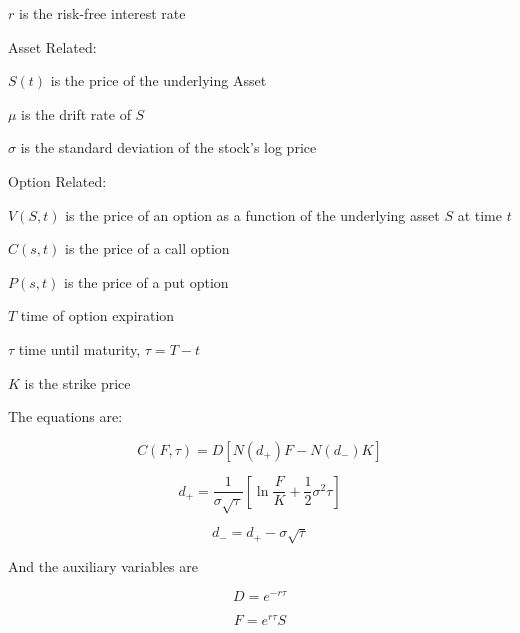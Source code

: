 \documentclass{article}
\begin{document}
$r$ is the risk-free interest rate

Asset Related:

$S(t)$ is the price of the underlying Asset

$\mu$ is the drift rate of $S$

$\sigma$ is the standard deviation of the stock's log price

Option Related:

$V(S,t)$ is the price of an option as a function of the underlying asset $S$ at time $t$

$C(s,t)$ is the price of a call option

$P(s,t)$ is the price of a put option

$T$ time of option expiration

$\tau$ time until maturity, $\tau = T - t$

$K$ is the strike price

The equations are:

$$C(F,\tau) = D \left[ N(d_+) F - N(d_-) K \right]$$

$$d_+ = \frac{1}{\sigma \sqrt{\tau}} \left[ \ln \frac{F}{K} + \frac{1}{2}\sigma^2\tau\right]$$

$$d_- = d_+ - \sigma \sqrt{\tau}$$

And the auxiliary variables are 

$$D = e^{-r\tau}$$

$$F = e^{r\tau}S$$
\end{document}
